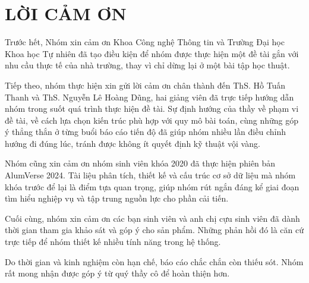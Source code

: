 \documentclass[12pt,a4paper,oneside]{report}
\begin{document}
\setcounter{page}{1}

\chapter*{LỜI CẢM ƠN}

Trước hết, Nhóm xin cảm ơn Khoa Công nghệ Thông tin và Trường Đại học Khoa học Tự nhiên đã tạo điều kiện để nhóm được thực hiện một đề tài gắn với nhu cầu thực tế của nhà trường, thay vì chỉ dừng lại ở một bài tập học thuật.

Tiếp theo, nhóm thực hiện xin gửi lời cảm ơn chân thành đến ThS. Hồ Tuấn Thanh và ThS. Nguyễn Lê Hoàng Dũng, hai giảng viên đã trực tiếp hướng dẫn nhóm trong suốt quá trình thực hiện đề tài. Sự định hướng của thầy về phạm vi đề tài, về cách lựa chọn kiến trúc phù hợp với quy mô bài toán, cùng những góp ý thẳng thắn ở từng buổi báo cáo tiến độ đã giúp nhóm nhiều lần điều chỉnh hướng đi đúng lúc, tránh được không ít quyết định kỹ thuật vội vàng.

Nhóm cũng xin cảm ơn nhóm sinh viên khóa 2020 đã thực hiện phiên bản AlumVerse 2024. Tài liệu phân tích, thiết kế và cấu trúc cơ sở dữ liệu mà nhóm khóa trước để lại là điểm tựa quan trọng, giúp nhóm rút ngắn đáng kể giai đoạn tìm hiểu nghiệp vụ và tập trung nguồn lực cho phần cải tiến.

Cuối cùng, nhóm xin cảm ơn các bạn sinh viên và anh chị cựu sinh viên đã dành thời gian tham gia khảo sát và góp ý cho sản phẩm. Những phản hồi đó là căn cứ trực tiếp để nhóm thiết kế nhiều tính năng trong hệ thống.

Do thời gian và kinh nghiệm còn hạn chế, báo cáo chắc chắn còn thiếu sót. Nhóm rất mong nhận được góp ý từ quý thầy cô để hoàn thiện hơn.

\newpage
\renewcommand{\cfttoctitlefont}{\hfill\fontsize{14}{18}\selectfont\bfseries}
\renewcommand{\cftaftertoctitle}{\hfill}
\renewcommand{\cftloftitlefont}{\hfill\fontsize{14}{18}\selectfont\bfseries}
\renewcommand{\cftafterloftitle}{\hfill}
\renewcommand{\cftlottitlefont}{\hfill\fontsize{14}{18}\selectfont\bfseries}
\renewcommand{\cftafterlottitle}{\hfill}
\tableofcontents

\newpage
\listoffigures
{}

\newpage
\listoftables
{}

\newpage
\end{document}
